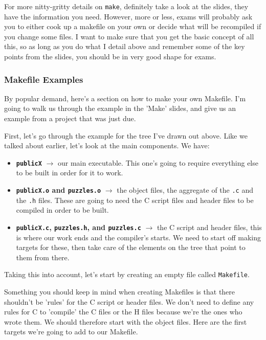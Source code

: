\documentclass[english, 10pt]{article}
\begin{document}
For more nitty-gritty details on \texttt{make}, definitely take a look at the slides, they have the information you need. However, more or less, exams will probably ask you to either cook up a makefile on your own or decide what will be recompiled if you change some files. I want to make sure that you get the basic concept of all this, so as long as you do what I detail above and remember some of the key points from the slides, you should be in very good shape for exams.

\subsubsection{Makefile Examples}

By popular demand, here's a section on how to make your own Makefile. I'm going to walk us through the example in the 'Make' slides, and give us an example from a project that was just due.\newline

First, let's go through the example for the tree I've drawn out above. Like we talked about earlier, let's look at the main components. We have:

\begin{itemize}
	\item \textbf{\texttt{publicX}} $\rightarrow$ our main executable. This one's going to require everything else to be built in order for it to work.
	\item \textbf{\texttt{publicX.o} and \texttt{puzzles.o}} $\rightarrow$ the object files, the aggregate of the \texttt{.c} and the \texttt{.h} files. These are going to need the C script files and header files to be compiled in order to be built.
	\item \textbf{\texttt{publicX.c}, \texttt{puzzles.h}, and \texttt{puzzles.c}} $\rightarrow$ the C script and header files, this is where our work ends and the compiler's starts. We need to start off making targets for these, then take care of the elements on the tree that point to them from there.
\end{itemize}

Taking this into account, let's start by creating an empty file called \texttt{Makefile}. \newline

Something you should keep in mind when creating Makefiles is that there shouldn't be 'rules' for the C script or header files. We don't need to define any rules for C to 'compile' the C files or the H files because we're the ones who wrote them. We should therefore start with the object files. Here are the first targets we're going to add to our Makefile.
\end{document}
